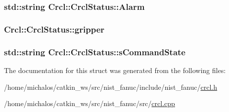 \hypertarget{structCrcl_1_1CrclStatus_a0cd3ee396ed753479bd03ec30809db22}{
\subsubsection[{Alarm}]{\setlength{\rightskip}{0pt plus 5cm}std\-::string Crcl\-::\-Crcl\-Status\-::\-Alarm}}\label{structCrcl_1_1CrclStatus_a0cd3ee396ed753479bd03ec30809db22}
\hypertarget{structCrcl_1_1CrclStatus_add19fb6e10e25182b651f0dc2dbacd8a}{
\subsubsection[{gripper}]{ Crcl\-::\-Crcl\-Status\-::gripper}}\label{structCrcl_1_1CrclStatus_add19fb6e10e25182b651f0dc2dbacd8a}
\hypertarget{structCrcl_1_1CrclStatus_af485e1524d7eb0f8108fabeb9ae371f8}{
\subsubsection[{s\-Command\-State}]{\setlength{\rightskip}{0pt plus 5cm}std\-::string Crcl\-::\-Crcl\-Status\-::s\-Command\-State}}\label{structCrcl_1_1CrclStatus_af485e1524d7eb0f8108fabeb9ae371f8}


The documentation for this struct was generated from the following files\-:\begin{DoxyCompactItemize}
\item 
/home/michalos/catkin\-\_\-ws/src/nist\-\_\-fanuc/include/nist\-\_\-fanuc/\hyperlink{crcl_8h}{crcl.\-h}\item 
/home/michalos/catkin\-\_\-ws/src/nist\-\_\-fanuc/src/\hyperlink{crcl_8cpp}{crcl.\-cpp}\end{DoxyCompactItemize}
